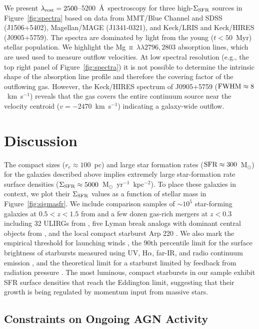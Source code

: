\documentclass[apj]{emulateapj}
\newcommand{\kms}{km~s$^{-1}$}
\newcommand{\mgii}{\textrm{Mg}~\textsc{ii}}
\newcommand{\msun}{M$_{\odot}$}
\newcommand{\units}{M$_{\odot}$~yr$^{-1}$~kpc$^{-2}$}
\newcommand{\lrest}{\lambda_{\textnormal{\scriptsize{rest}}}}
\newcommand{\sigmasfr}{\Sigma_{\textnormal{\scriptsize{SFR}}}}
\begin{document}
We present $\lrest=2500$--5200~\AA\ spectroscopy for three
high-$\sigmasfr$ sources in Figure~\ref{fig:spectra} based on data
from MMT/Blue Channel and SDSS (J1506+5402), Magellan/MAGE
(J1341-0321), and Keck/LRIS and Keck/HIRES (J0905+5759).  The spectra
are dominated by light from the young ($t<50$~Myr) stellar population.
We highlight the \mgii~$\lambda\lambda2796,2803$ absorption lines,
which are used used to measure outflow velocities.  At low spectral
resolution (e.g., the top right panel of Figure~\ref{fig:spectra}) it
is not possible to determine the intrinsic shape of the absorption
line profile and therefore the covering factor of the outflowing gas.
However, the Keck/HIRES spectrum of J0905+5759
($\textnormal{FWHM}\approx8$~\kms) reveals that the gas covers the
entire continuum source near the velocity centroid ($v=-2470$~\kms)
indicating a galaxy-wide outflow.


\section{Discussion}

The compact sizes ($r_e\approx100$~pc) and large star formation rates
($\textnormal{SFR}\approx300$~\msun) for the galaxies described above
implies extremely large star-formation rate surface densities
($\sigmasfr\approx5000$~\units).  To place these galaxies in context,
we plot their $\sigmasfr$ values as a function of stellar mass in
Figure~\ref{fig:sigmasfr}.  We include comparison samples of
$\sim10^5$ star-forming galaxies at $0.5<z<1.5$ from \citet{wuy11} and
a few dozen gas-rich mergers at $z<0.3$ including 32 ULIRGs from
\citet{vei06}, five Lyman break analogs with dominant central objects
from \citet{ove09}, and the local compact starburst Arp 220
\citep{sco97, ken98, rod08}.  We also mark the empirical threshold for
launching winds \citep[$\sigmasfr\approx0.1$~\units,][]{hec02}, the
90th percentile limit for the surface brightness of starbursts
measured using UV, H$\alpha$, far-IR, and radio continuum emission
\citep[$\sigmasfr\approx45$~\units][]{meu97}, and the theoretical
limit for a starburst limited by feedback from radiation pressure
\citep[$\sigmasfr\approx2000$~\units,][]{mur05,tho05,hop10}.  The most
luminous, compact starbursts in our sample exhibit SFR surface
densities that reach the Eddington limit, suggesting that their growth
is being regulated by momentum input from massive stars.


\subsection{Constraints on Ongoing AGN Activity}
\end{document}
